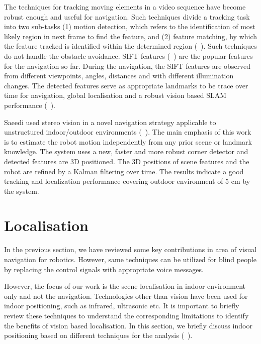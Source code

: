 The techniques for tracking moving elements 
in a video sequence have become robust enough and useful 
for navigation. Such techniques divide a tracking task into two sub-tasks
(1) motion detection, which refers to the identification 
of most likely region in next frame to find the feature, 
and (2) feature matching, by which the 
feature tracked is identified within the determined region (~\citet{trucco06}).
Such techniques do not handle the obstacle avoidance.
SIFT features (~\citet{lowe04}) are the popular features 
for the navigation so far. During the navigation, the 
SIFT features are observed from different viewpoints, angles, distances 
and with different illumination changes. The detected features serve as 
appropriate landmarks to be trace over time for navigation, 
global localisation and a robust vision based SLAM performance 
(~\citet{se01, se05}).

Saeedi used stereo vision in a novel navigation strategy applicable to unstructured
indoor/outdoor environments (~\citet{saeedi06}). 
The main emphasis of this work is to estimate the robot motion
independently from any prior scene or landmark knowledge. 
The system uses a new, faster and more
robust corner detector and detected features are 3D positioned.
The 3D positions of scene features and the robot 
are refined by a Kalman filtering over time. The results 
indicate a good tracking and localization performance covering 
outdoor environment of 5 cm by the system.

\section{Localisation}
\label{sec:localisation}
In the previous section, we have reviewed 
some key contributions in area of visual navigation 
for robotics. However, same techniques can be utilized 
for blind people by replacing the control signals 
with appropriate voice messages.
 
However, the focus of our work is the scene localisation 
in indoor environment only and not the navigation. 
Technologies other than vision have been used 
for indoor positioning, such as infrared,
ultrasonic etc. It is important to briefly review these techniques 
to understand the corresponding limitations to 
identify the benefits of vision based localisation. 
In this section, we briefly discuss indoor positioning based on 
different techniques for the analysis (~\citet{indoorsurvey11, gu09}). 


